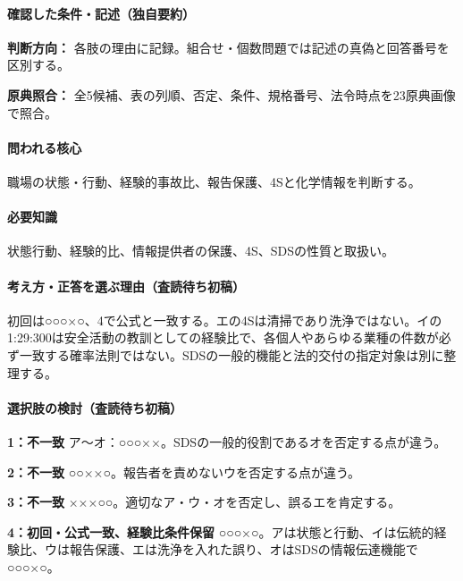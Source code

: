 \paragraph{確認した条件・記述（独自要約）}\mbox{}\par

\noindent\textbf{判断方向：} 各肢の理由に記録。組合せ・個数問題では記述の真偽と回答番号を区別する。\par

\noindent\textbf{原典照合：} 全5候補、表の列順、否定、条件、規格番号、法令時点を23原典画像で照合。\par

\paragraph{問われる核心} 職場の状態・行動、経験的事故比、報告保護、4Sと化学情報を判断する。

\paragraph{必要知識} 状態行動、経験的比、情報提供者の保護、4S、SDSの性質と取扱い。

\paragraph{考え方・正答を選ぶ理由（査読待ち初稿）} 初回は○○○×○、4で公式と一致する。エの4Sは清掃であり洗浄ではない。イの1:29:300は安全活動の教訓としての経験比で、各個人やあらゆる業種の件数が必ず一致する確率法則ではない。SDSの一般的機能と法的交付の指定対象は別に整理する。

\paragraph{選択肢の検討（査読待ち初稿）}\mbox{}\par

\noindent\textbf{1：不一致} ア〜オ：○○○××。SDSの一般的役割であるオを否定する点が違う。\par

\noindent\textbf{2：不一致} ○○××○。報告者を責めないウを否定する点が違う。\par

\noindent\textbf{3：不一致} ×××○○。適切なア・ウ・オを否定し、誤るエを肯定する。\par

\noindent\textbf{4：初回・公式一致、経験比条件保留} ○○○×○。アは状態と行動、イは伝統的経験比、ウは報告保護、エは洗浄を入れた誤り、オはSDSの情報伝達機能で○○○×○。\par

